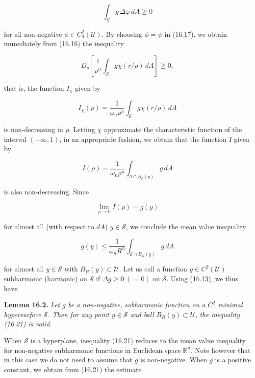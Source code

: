 \begin{equation}
\int_{\mathcal{G}} g\,\Delta\varphi\, dA \geq 0
\tag{16.17}
\end{equation}



for all non-negative $\phi \in C_0^2(\mathcal{U})$. By choosing $\phi=\psi$ in (16.17), we obtain immediately from (16.16) the inequality

\[
D_\rho\!\left[\frac{1}{\rho^n}\int_{\mathcal{S}} g\chi(r/\rho)\,dA\right]\geq 0,
\]

that is, the function $I_{\chi}$ given by

\begin{equation}
I_{\chi}(\rho)=\frac{1}{\omega_n\rho^n}\int_{\mathcal{S}} g\chi(r/\rho)\,dA
\tag{16.18}
\end{equation}

is non-decreasing in $\rho$. Letting $\chi$ approximate the characteristic function of the interval $(-\infty,1)$, in an appropriate fashion, we obtain that the function $I$ given by

\begin{equation}
I(\rho)=\frac{1}{\omega_n\rho^n}\int_{\mathcal{S}\cap B_{\rho}(y)} g\,dA
\tag{16.19}
\end{equation}

is also non-decreasing. Since

\begin{equation}
\lim_{\rho\to 0} I(\rho)=g(y)
\tag{16.20}
\end{equation}

for almost all (with respect to $dA$) $y\in\mathcal{S}$, we conclude the mean value inequality

\begin{equation}
g(y)\leq \frac{1}{\omega_n R^n}\int_{\mathcal{S}\cap B_R(y)} g\,dA
\tag{16.21}
\end{equation}

for almost all $y\in\mathcal{S}$ with $B_R(y)\subset \mathcal{U}$. Let us call a function $g\in C^2(\mathcal{U})$ subharmonic (harmonic) on $\mathcal{S}$ if $\Delta g\geq 0\; (=0)$ on $\mathcal{S}$. Using (16.13), we thus have

\textbf{Lemma 16.2.} \emph{Let $g$ be a non-negative, subharmonic function on a $C^2$ minimal hypersurface $\mathcal{S}$. Then for any point $y\in\mathcal{S}$ and ball $B_R(y)\subset \mathcal{U}$, the inequality (16.21) is valid.}

When $\mathcal{S}$ is a hyperplane, inequality (16.21) reduces to the mean value inequality for non-negative subharmonic functions in Euclidean space $\mathbb{R}^n$. Note however that in this case we do not need to assume that $g$ is non-negative. When $g$ is a positive constant, we obtain from (16.21) the estimate


